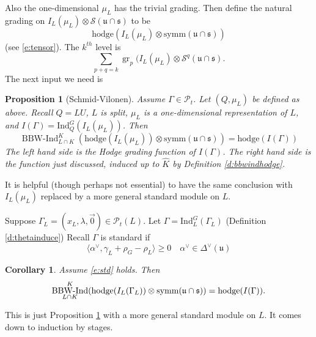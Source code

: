 \documentclass[12pt,leqno]{article}
\newtheorem{corollary}[equation]{Corollary}
\newtheorem{proposition}[equation]{Proposition}
\newcommand{\hodge}{\text{hodge}}
\DeclareMathOperator{\gr}{\text{gr}}
\DeclareMathOperator{\bbwind}{\text{BBW-Ind}}
\newcommand{\Ind}{\text{Ind}}
\newcommand\Pt{\mathcal P_t}
\renewcommand{\S}{\mathcal S}
\newcommand{\symm}{\text{symm}}
\renewcommand{\u}{\mathfrak u}
\newcommand{\ucaps}{\mathfrak u\cap\mathfrak s}
\newcommand{\ch}[1]{#1^\vee}
\newcommand{\Khat}{\widehat K}
\begin{document}
Also the one-dimensional $\mu_L$ has the trivial grading.
Then define the natural grading on
$I_L(\mu_L)\otimes\S(\ucaps)$
to be
$$
\hodge(I_L(\mu_L)\otimes\symm(\ucaps))
$$
(see \eqref{e:tensor}). The  $k^{th}$ level is
$$
\sum_{p+q=k}\gr_p(I_L(\mu_L)\otimes \S^q(\ucaps).
$$
The next input we need is

\begin{proposition}[Schmid-Vilonen]
\label{p:svbbwind}
Assume $\Gamma\in\Pt$. Let $(Q,\mu_L)$ be defined as above.  Recall
$Q=LU$, $L$ is split, $\mu_L$ is a one-dimensional representation of
$L$, and $I(\Gamma)=\Ind_Q^G(I_L(\mu_L))$.  \normalfont
Then
$$
\bbwind_{L\cap K}^K(\hodge(I_L(\mu_L))\otimes\symm(\ucaps))=\hodge(I(\Gamma))
$$
The left hand side is the Hodge grading function of $I(\Gamma)$. The
right hand side is the function just discussed, induced up to $\Khat$ by Definition \ref{d:bbwindhodge}.
\end{proposition}

It is helpful (though perhaps not essential) to have the same
conclusion with $I_L(\mu_L)$ replaced by a more general standard module on $L$.

Suppose $\Gamma_L=(x_L,\lambda,\vec 0)\in\Pt(L)$.
Let $\Gamma=\Ind_L^G(\Gamma_L)$ (Definition \ref{d:thetainduce})
Recall $\Gamma$ is standard if
\begin{equation}
\label{e:std}
\langle\ch\alpha,\gamma_L+\rho_G-\rho_L\rangle\ge
0\quad\ch\alpha\in\ch\Delta(\u)
\end{equation}




\begin{corollary}
\label{c:svbbwind}
Assume \eqref{e:std} holds. Then
$$
\normalfont
\bbwind_{L\cap K}^K(\hodge(I_L(\Gamma_L))\otimes\symm(\ucaps))=\hodge(I(\Gamma)).
$$
\end{corollary}
This is just Proposition \ref{p:svbbwind} with a more general standard module on $L$.
It comes down to induction by stages.

\medskip
\end{document}
